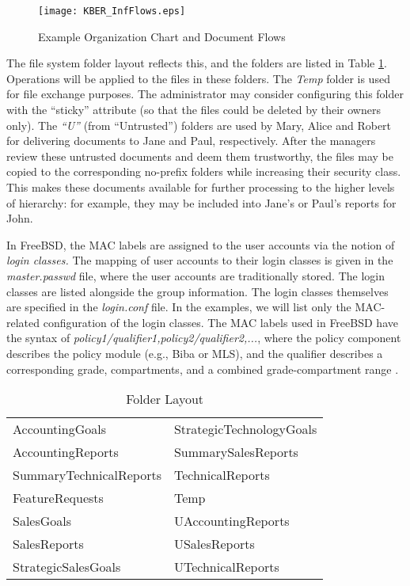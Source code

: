 \documentclass[10pt,a4paper,conference,onecolumn]{IEEEtran}
\newcommand{\KBERcode}[1]{\textsl{#1}}
\begin{document}
\begin{figure}[ht]
\centering
\texttt{[image: KBER\_InfFlows.eps]}
\caption{Example Organization Chart and Document Flows}
\label{KBER_InfFlows}
\end{figure}

The file system folder layout reflects this, and the folders are listed in 
Table \ref{tab:FolderLayout}. Operations will be applied to the files in these folders. The \KBERcode{Temp} folder is
used for file exchange purposes. The administrator may consider configuring this
folder with the ``sticky'' attribute (so that the files could be deleted by their
owners only). The \KBERcode{``U''} (from ``Untrusted'') folders are used by Mary, Alice and Robert for delivering
documents to Jane and Paul, respectively. After the managers review these untrusted
documents and deem them trustworthy, the files may be copied to the corresponding no-prefix folders
while increasing their security class. This makes these documents available 
for further processing to the higher levels of hierarchy: for example, they may be included into
Jane's or Paul's reports for John.

In FreeBSD, the MAC labels are assigned to the user accounts via the notion of \emph{login classes.}
The mapping of user accounts to their login classes is given in the \KBERcode{master.passwd} file, 
where the user accounts are traditionally stored. The login classes 
are listed alongside the group information. The login classes themselves are 
specified in the \KBERcode{login.conf} file. In the examples, we will list only the 
MAC-related configuration of the login classes. The MAC labels used in FreeBSD have the
syntax of \KBERcode{policy1/qualifier1,policy2/qualifier2,...}, where the policy component
describes the policy module (e.g., Biba or MLS), and the qualifier describes a corresponding 
grade, compartments, and a combined grade-compartment range \cite{KBER:Handbook}.

\begin{table}[ht]
\centering
\caption{Folder Layout}\label{tab:FolderLayout}
\begin{tabular}{|l|l|}\hline
AccountingGoals          & StrategicTechnologyGoals \\
AccountingReports                  & SummarySalesReports \\
SummaryTechnicalReports  & TechnicalReports\\
FeatureRequests                            & Temp\\
SalesGoals                                                       & UAccountingReports\\
SalesReports                                             & USalesReports\\
StrategicSalesGoals              & UTechnicalReports\\
\hline
\end{tabular}
\end{table}
\end{document}
